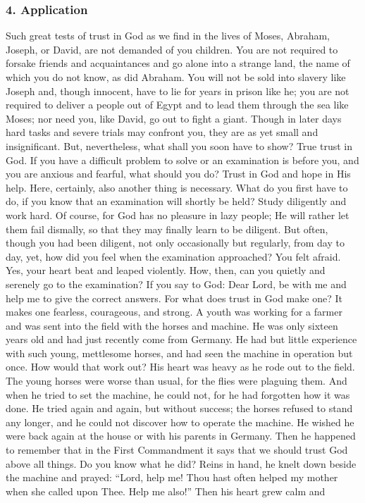 \subsubsection{4. Application} Such great tests of trust in God as we find in the lives of Moses, Abraham, Joseph, or David, are not demanded of you children. You are not required to forsake friends and acquaintances and go alone into a strange land, the name of which you do not know, as did Abraham. You will not be sold into slavery like Joseph and, though innocent, have to lie for years in prison like he; you are not required to deliver a people out of Egypt and to lead them through the sea like Moses; nor need you, like David, go out to fight a giant. Though in later days hard tasks and severe trials may confront you, they are as yet small and insignificant. But, nevertheless, what shall you soon have to show? True trust in God. If you have a difficult problem to solve or an examination is before you, and you are anxious and fearful, what should you do? Trust in God and hope in His help. Here, certainly, also another thing is necessary. What do you first have to do, if you know that an examination will shortly be held? Study diligently and work hard. Of course, for God has no pleasure in lazy people; He will rather let them fail dismally, so that they may finally learn to be diligent. But often, though you had been diligent, not only occasionally but regularly, from day to day, yet, how did you feel when the examination approached? You felt afraid. Yes, your heart beat and leaped violently. How, then, can you quietly and serenely go to the examination? If you say to God: Dear Lord, be with me and help me to give the correct answers. For what does trust in God make one? It makes one fearless, courageous, and strong. A youth was working for a farmer and was sent into the field with the horses and machine. He was only sixteen years old and had just recently come from Germany. He had but little experience with such young, mettlesome horses, and had seen the machine in operation but once. How would that work out? His heart was heavy as he rode out to the field. The young horses were worse than usual, for the flies were plaguing them. And when he tried to set the machine, he could not, for he had forgotten how it was done. He tried again and again, but without success; the horses refused to stand any longer, and he could not discover how to operate the machine. He wished he were back again at the house or with his parents in Germany. Then he happened to remember that in the First Commandment it says that we should trust God above all things. Do you know what he did? Reins in hand, he knelt down beside the machine and prayed: “Lord, help me! Thou hast often helped my mother when she called upon Thee. Help me also!” Then his heart grew calm and
